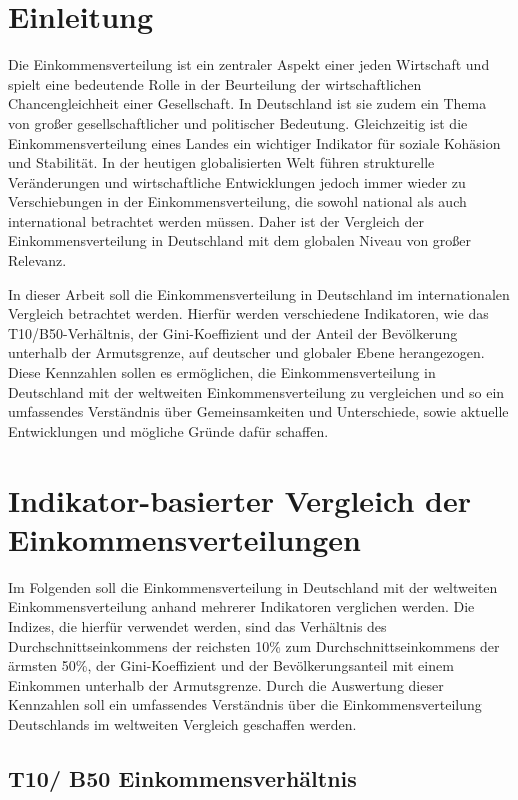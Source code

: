\chapter{Einleitung}

Die Einkommensverteilung ist ein zentraler Aspekt einer jeden Wirtschaft und spielt eine bedeutende Rolle in der Beurteilung der wirtschaftlichen Chancengleichheit einer Gesellschaft. In Deutschland ist sie zudem ein Thema von gro{\ss}er gesellschaftlicher und politischer Bedeutung. Gleichzeitig ist die Einkommensverteilung eines Landes ein wichtiger Indikator für soziale Kohäsion und Stabilität. In der heutigen globalisierten Welt führen strukturelle Veränderungen und wirtschaftliche Entwicklungen jedoch immer wieder zu Verschiebungen in der Einkommensverteilung, die sowohl national als auch international betrachtet werden müssen. Daher ist der Vergleich der Einkommensverteilung in Deutschland mit dem globalen Niveau von gro{\ss}er Relevanz.

In dieser Arbeit soll die Einkommensverteilung in Deutschland im internationalen Vergleich betrachtet werden. Hierfür werden verschiedene Indikatoren, wie das T10/B50-Verhältnis, der Gini-Koeffizient und der Anteil der Bevölkerung unterhalb der Armutsgrenze, auf deutscher und globaler Ebene herangezogen. Diese Kennzahlen sollen es ermöglichen, die Einkommensverteilung in Deutschland mit der weltweiten Einkommensverteilung zu vergleichen und so ein umfassendes Verständnis über Gemeinsamkeiten und Unterschiede, sowie aktuelle Entwicklungen und mögliche Gründe dafür schaffen.

\chapter{Indikator-basierter Vergleich der Einkommensverteilungen}

Im Folgenden soll die Einkommensverteilung in Deutschland mit der weltweiten Einkommensverteilung anhand mehrerer Indikatoren verglichen werden. Die Indizes, die hierfür verwendet werden, sind das Verhältnis des Durchschnittseinkommens der reichsten 10\% zum Durchschnittseinkommens der ärmsten 50\%, der Gini-Koeffizient und der Bevölkerungsanteil mit einem Einkommen unterhalb der Armutsgrenze. Durch die Auswertung dieser Kennzahlen soll ein umfassendes Verständnis über die Einkommensverteilung Deutschlands im weltweiten Vergleich geschaffen werden.

\section{T10/ B50 Einkommensverhältnis}

